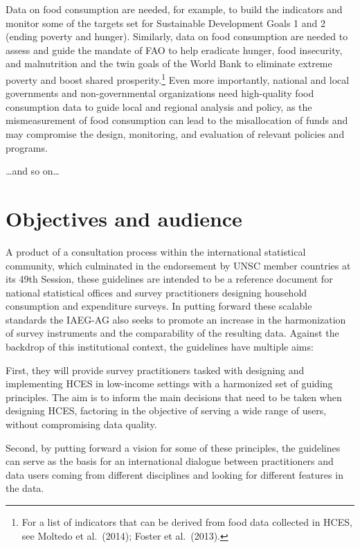 \documentclass[
]{book}
\begin{document}
Data on food consumption are needed, for example, to build the indicators and monitor some of the targets set for Sustainable Development Goals 1 and 2 (ending poverty and hunger). Similarly, data on food consumption are needed to assess and guide the mandate of FAO to help eradicate hunger, food insecurity, and malnutrition and the twin goals of the World Bank to eliminate extreme poverty and boost shared prosperity.\footnote{For a list of indicators that can be derived from food data collected in HCES, see Moltedo et al.~(2014); Foster et al.~(2013).} Even more importantly, national and local governments and non-governmental organizations need high-quality food consumption data to guide local and regional analysis and policy, as the mismeasurement of food consumption can lead to the misallocation of funds and may compromise the design, monitoring, and evaluation of relevant policies and programs.

\ldots and so on\ldots{}

\hypertarget{objectives-and-audience}{%
\section{Objectives and audience}\label{objectives-and-audience}}

A product of a consultation process within the international statistical community, which culminated in the endorsement by UNSC member countries at its 49th Session, these guidelines are intended to be a reference document for national statistical offices and survey practitioners designing household consumption and expenditure surveys. In putting forward these scalable standards the IAEG-AG also seeks to promote an increase in the harmonization of survey instruments and the comparability of the resulting data. Against the backdrop of this institutional context, the guidelines have multiple aims:

First, they will provide survey practitioners tasked with designing and implementing HCES in low-income settings with a harmonized set of guiding principles. The aim is to inform the main decisions that need to be taken when designing HCES, factoring in the objective of serving a wide range of users, without compromising data quality.

Second, by putting forward a vision for some of these principles, the guidelines can serve as the basis for an international dialogue between practitioners and data users coming from different disciplines and looking for different features in the data.
\end{document}

